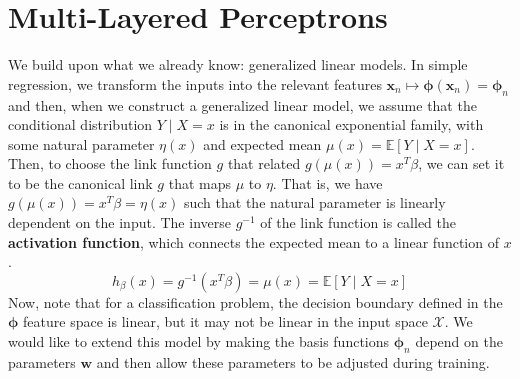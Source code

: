 \documentclass{article}
\begin{document}

\title{}
\author{Muchang Bahng}
\date{Spring 2023}

\maketitle
\tableofcontents
\pagebreak 




\section{Multi-Layered Perceptrons} 

  We build upon what we already know: generalized linear models. In simple regression, we transform the inputs into the relevant features $\mathbf{x}_n \mapsto \boldsymbol{\phi} (\mathbf{x}_n) = \boldsymbol{\phi}_n$ and then, when we construct a generalized linear model, we assume that the conditional distribution $Y \mid X = x$ is in the canonical exponential family, with some natural parameter $\eta(x)$ and expected mean $\mu(x) = \mathbb{E}[Y \mid X = x]$. Then, to choose the link function $g$ that related $g(\mu(x)) = x^T \beta$, we can set it to be the canonical link $g$ that maps $\mu$ to $\eta$. That is, we have $g(\mu(x)) = x^T \beta = \eta (x)$ such that the natural parameter is linearly dependent on the input. The inverse $g^{-1}$ of the link function is called the \textbf{activation function}, which connects the expected mean to a linear function of $x$. 
  \begin{equation}
    h_\beta (x) = g^{-1} (x^T \beta) = \mu(x) = \mathbb{E}[Y \mid X = x]
  \end{equation}
  Now, note that for a classification problem, the decision boundary defined in the $\boldsymbol{\phi}$ feature space is linear, but it may not be linear in the input space $\mathcal{X}$. We would like to extend this model by making the basis functions $\boldsymbol{\phi}_n$ depend on the parameters $\mathbf{w}$ and then allow these parameters to be adjusted during training. 
\end{document}
